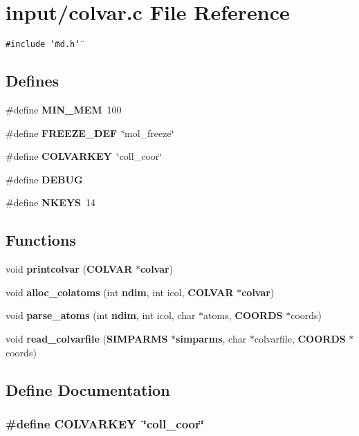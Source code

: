 \section{input/colvar.c File Reference}
\label{colvar_8c}
{\tt \#include \char`\"{}md.h\char`\"{}}\par
\subsection*{Defines}
\begin{CompactItemize}
\item 
\#define {\bf MIN\_\-MEM}~100
\item 
\#define {\bf FREEZE\_\-DEF}~\char`\"{}mol\_\-freeze\char`\"{}
\item 
\#define {\bf COLVARKEY}~\char`\"{}coll\_\-coor\char`\"{}
\item 
\#define {\bf DEBUG}
\item 
\#define {\bf NKEYS}~14
\end{CompactItemize}
\subsection*{Functions}
\begin{CompactItemize}
\item 
void {\bf printcolvar} ({\bf COLVAR} $\ast${\bf colvar})
\item 
void {\bf alloc\_\-colatoms} (int {\bf ndim}, int icol, {\bf COLVAR} $\ast${\bf colvar})
\item 
void {\bf parse\_\-atoms} (int {\bf ndim}, int icol, char $\ast$atoms, {\bf COORDS} $\ast$coords)
\item 
void {\bf read\_\-colvarfile} ({\bf SIMPARMS} $\ast${\bf simparms}, char $\ast$colvarfile, {\bf COORDS} $\ast$coords)
\end{CompactItemize}


\subsection{Define Documentation}
\subsubsection{\setlength{\rightskip}{0pt plus 5cm}\#define COLVARKEY~\char`\"{}coll\_\-coor\char`\"{}}\label{colvar_8c_2ab8bccce5b5a850d95c8c99ccc647c6}



